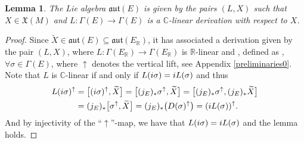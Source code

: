 \documentclass[11pt]{article}
\numberwithin{equation}{section}
\numberwithin{equation}{section}
\newtheorem{Lemma}[Theorem]{Lemma}
\newcommand{\R}{{\mathbb{R}}}
\newcommand{\C}{{\mathbb{C}}}
\newcommand{\X}{\mathfrak{X}}
\newcommand{\aut}{\mathfrak{aut}}
\DeclareMathOperator{\pr}{pr}
\begin{document}
 \begin{Lemma} The Lie algebra $\mathfrak{aut}(E)$ is given by the pairs $(L,X)$ such that $X\in \mathfrak{X}(M)$ and $L\colon \Gamma (E)\to \Gamma (E)$ is a $\C$-linear derivation with respect to $X$.
 \end{Lemma}
\begin{proof}
Since $\widetilde{X}\in \aut(E)\subseteq \aut (E_{\R})$, it has associated a derivation given by the pair $(L, X)$, where $L\colon \Gamma(E_{\R})\to \Gamma(E_{\R})$ is $\R$-linear and \smash{$X=\pr_* \widetilde{X}\in \X(M)$}, defined as , ${\forall \sigma\in \Gamma(E)}$, where $\uparrow$ denotes the vertical lift, see Appendix \ref{preliminaries0}. Note that $L$ is $\C$-linear if and only if $L({\rm i}\sigma)={\rm i}L(\sigma)$ and thus
\begin{align*}
L({\rm i}\sigma)^{\uparrow}&{}=\bigl[({\rm i}\sigma)^{\uparrow}, \widetilde{X}\bigr]=\bigl[(j_{E})_* \sigma^{\uparrow}, \widetilde{X}\bigr]=\bigl[(j_{E})_* \sigma^{\uparrow},(j_{E})_* \widetilde{X}\bigr]\\
&{}=(j_E)_* \bigl[\sigma^{\uparrow}, \widetilde{X}\bigr]=(j_{E})_* \bigl(D(\sigma)^{\uparrow}\bigr)=({\rm i}L(\sigma))^{\uparrow}.
\end{align*}
And by injectivity of the ``$\uparrow$''-map, we have that $L({\rm i}\sigma)={\rm i}L(\sigma)$ and the lemma holds.
\end{proof}
\end{document}
